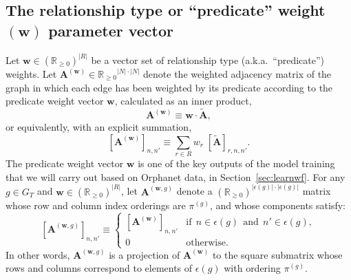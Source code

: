 \documentclass[11pt,notitlepage,english]{article}
\begin{document}
\subsection{The relationship type or ``predicate'' weight $({\boldsymbol w})$ parameter vector}
Let ${\boldsymbol w} \in {({\mathbb R}_{\geq 0})}^{|R|}$ be a vector set of
relationship type (a.k.a.\ ``predicate'') weights.  Let
${\boldsymbol A}^{({\boldsymbol w})} \in {{\mathbb R}_{\ge 0}}^{|N| \cdot |N|}$ denote the 
weighted adjacency matrix of the graph in which each edge has been weighted
by its predicate according to the predicate weight vector ${\boldsymbol w}$,
calculated as an inner product,
\begin{equation}
{\boldsymbol A}^{({\boldsymbol w})} \equiv {\boldsymbol w} \cdot \widetilde{\boldsymbol A},
\end{equation}
or equivalently, with an explicit summation,
\begin{equation}
{[{\boldsymbol A}^{({\boldsymbol w})}]}_{n,n'} \equiv \sum_{r \in R} w_r \; {[\widetilde{\boldsymbol A}]}_{r,n,n'}.
\end{equation}
The predicate weight vector ${\boldsymbol w}$ is one of the key outputs of the
model training that we will carry out based on Orphanet data, in Section~\ref{sec:learnwf}. For any $g \in G_T$ and
${\boldsymbol w} \in {({\mathbb R}_{\geq 0})}^{|R|}$,
let ${\boldsymbol A}^{({\boldsymbol w}, g)}$ denote a
  ${({\mathbb R}_{\geq 0})}^{|\epsilon(g)|\cdot|\epsilon(g)|}$ matrix whose row and
column index orderings are $\pi^{(g)}$, and whose components satisfy:
\begin{equation}
  {[{\boldsymbol A}^{({\boldsymbol w},g)}]}_{n,n'} \equiv
  \begin{cases}
    {[{\boldsymbol A}^{({\boldsymbol w})}]}_{n,n'} & \textrm{if} \;\, n \in \epsilon(g) \;\,
    \textrm{and} \;\, n' \in \epsilon(g), \\
      0 & \textrm{otherwise}.
  \end{cases}
\end{equation}
  In other words, ${\boldsymbol A}^{({\boldsymbol w},g)}$ is a projection of
  ${{\boldsymbol A}^{({\boldsymbol w})}}$ to the square submatrix whose rows
  and columns correspond to elements of $\epsilon(g)$ with ordering $\pi^{(g)}$.
\end{document}
